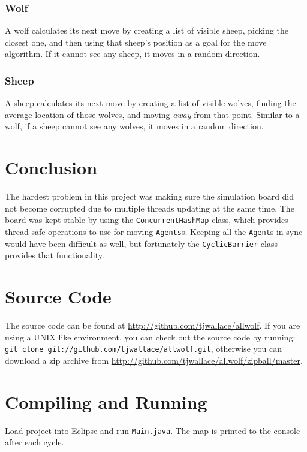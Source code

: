 \documentclass[pdftex,10pt]{article}
\begin{document}
\subsubsection{Wolf}\label{wolfMove}
A wolf calculates its next move by creating a list of visible sheep, picking the closest one, and then using that sheep's position as a goal for the move algorithm.  If it cannot see any sheep, it moves in a random direction.

\subsubsection{Sheep}\label{sheepMove}
A sheep calculates its next move by creating a list of visible wolves, finding the average location of those wolves, and moving {\em away} from that point.  Similar to a wolf, if a sheep cannot see any wolves, it moves in a random direction.

\section{Conclusion}\label{conclusion}
The hardest problem in this project was making sure the simulation board did not become corrupted due to multiple threads updating at the same time.  The board was kept stable by using the {\tt ConcurrentHashMap} class, which provides thread-safe operations to use for moving {\tt Agents}s.  Keeping all the {\tt Agent}s in sync would have been difficult as well, but fortunately the {\tt CyclicBarrier} class provides that functionality.

\appendix
\section{Source Code}
The source code can be found at \url{http://github.com/tjwallace/allwolf}.
If you are using a UNIX like environment, you can check out the source code by running: {\tt git clone git://github.com/tjwallace/allwolf.git}, otherwise you can download a zip archive from \url{http://github.com/tjwallace/allwolf/zipball/master}.

\section{Compiling and Running}
Load project into Eclipse and run {\tt Main.java}.  The map is printed to the console after each cycle.
\end{document}

